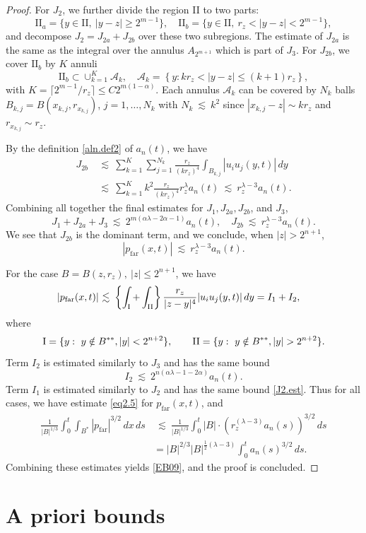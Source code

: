\documentclass[11pt]{article}
\numberwithin{equation}{section}
\theoremstyle{remark}
\theoremstyle{definition}
\newcommand{\bket}[1]{\left \{ #1 \right \}}
\newcommand{\lec}{{\ \lesssim \ }}
\newcommand\al{\alpha}
\newcommand\la{\lambda}
\newcommand{\EQ}[1]{\begin{equation} #1 \end{equation}}
\newcommand{\EQS}[1]{\begin{equation}\begin{split} #1 \end{split}\end{equation}}
\newcommand{\EQN}[1]{\begin{equation*}\begin{split} #1 \end{split}\end{equation*}}
\newcommand{\far}{{\mathrm{far}}}
\newcommand{\II}{\mathrm{II}}
\begin{document}
\begin{proof}
For $J_2$, %
we further divide the region II to two parts:
\[
\II_a = \{ y \in \II, \ |y-z|\ge 2^{m-1}\}, \quad
\II_b = \{ y \in \II, \ r_z<|y-z|<2^{m-1}\},
\]
and decompose $J_2=J_{2a}+J_{2b}$ over these two subregions. The estimate of $J_{2a}$ is the same as the integral over the annulus $A_{2^{m+1}}$ which is part of $J_3$. For $J_{2b}$, we cover $\II_b$ by $K$ annuli
\[
\II_b \subset \cup_{k=1}^K \mathcal{A}_k, \quad  \mathcal{A}_k = \bket{ y: kr_z < |y-z| \le (k+1)r_z},
\]
with $K=  \lceil 2^{m-1}/ r_z \rceil \le C2^{m(1-\al)} $.  Each annulus $ \mathcal{A}_k$ can be covered by $N_k$ balls $B_{k,j}=B(x_{k,j}, r_{x_{k,j}})$, $j=1,\ldots,N_k$ with $N_k \lec k^2$
since $|x_{k,j}-z| \sim kr_z$ and $r_{x_{k,j}} \sim r_z$.

By the definition \eqref{aln.def2} of $a_n(t)$,
we have
\EQS{\label{J2.est}
J_{2b} &\lec \sum_{k=1}^K \sum_{j=1}^{N_k}  \frac {r_z}{(kr_z)^4}  \int_{B_{k,j}} |u_iu_j(y,t)|\,dy
\\
&\lec  \sum_{k=1}^Kk^2  \frac {r_z}{(kr_z)^4} r_z^\la a_n(t)
\lec  r_z^{\la-3} a_n(t).
}
Combining all together the final estimates for $J_1,J_{2a}, J_{2b}$, and $J_3$,
\[
J_1 + J_{2a}+J_3 \lec 2^{m(\al \la -2\al-1)} a_n(t),\quad
J_{2b} \lec r_z^{\la-3} a_n(t).
\]
We see that $J_{2b}$ is the dominant term, and
we conclude, when $|z|>2^{n+1}$,
\EQ{\label{eq2.5}
|p_\text{far}(x,t)| \lec  r_z^{\la-3} a_n(t).
}

\bigskip
For the case $B=B(z,r_z),~|z|\le 2^{n+1}$, we have
\EQN{
|p_\text{far}(x,t)| &\lec
\bket{\int_{\textup{I} }+ \int_{ \textup{II} } }  \frac {r_z}{|z-y|^4}  |u_iu_j(y,t)|\,dy = I_1+I_2,
}
where
\[
\textup{I} = \{ y:~y\notin B^{**}, |y|<2^{n+2}\},\qquad
%
\textup{II} = \{ y:~ y\notin B^{**},|y|>2^{n+2}\}.
\]
Term $I_2$ is estimated similarly to $J_3$ and has the same bound
\[
I_2 \lec  2^{n(\al \la-1-2\al)} a_n(t).
\]
%
%
%
%
%
%
Term $I_1$ is estimated similarly to $J_2$ and has the same bound \eqref{J2.est}. Thus for all cases, we have estimate \eqref{eq2.5} for $p_\text{far}(x,t)$, and
\EQS{
\frac 1 {|B|^{1/3}} \int_0^t \int_{B^*} |p_\far |^{3/2}\,dx\,ds & \lec
\frac 1 {|B|^{1/3}} \int_0^t |B| \cdot ( r_z ^{( \la -3)} a_n(s))^{3/2} \,ds
\\
&=  |B|^{2/3} |B| ^{\frac 12(\la-3)} \int_0^t a_n(s)^{3/2} \,ds .
}
Combining these estimates yields \eqref{EB09}, and the proof is concluded.
\end{proof}

%
\section{A priori bounds}\label{sec4}
\end{document}
